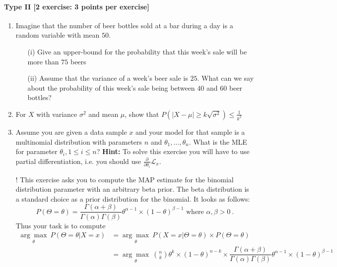\documentclass{article}
\begin{document}
\paragraph{Type II [2 exercise: 3 points per exercise]}
\begin{enumerate}
	\item Imagine that the number of beer bottles sold at a bar during a day is a random variable with mean $50$.
		\begin{itemize}
			\item[(i)] Give an upper-bound for the probability that this week's sale will be more than $75$ beers
			\item[(ii)] Assume that the variance of a week's beer sale is $25$. What can we say about the probability of this week's sale being between $40$ and $60$ beer bottles?
		\end{itemize}
	
	\item For $X$ with variance $\sigma^2$ and mean $\mu$, show that $P(|X-\mu| \geq k\sqrt{\sigma^2}) \leq \frac{1}{k^2}$
	
	\item Assume you are given a data sample $ x $ and your model for that sample is a multinomial distribution with parameters $ n $ and 
	$ \theta_{1}, \ldots, \theta_{n} $. What is the MLE for parameter $ \theta_{i}, 1 \leq i \leq n $? \textbf{Hint:} To solve this exercise you will
	have to use partial differentiation, i.e. you should use $ \frac{\partial}{\partial\theta_{i}}\mathcal{L}_{x} $.
	\item[\arabic{enumi}!] This exercise asks you to compute the MAP estimate for the binomial distribution parameter with an arbitrary beta prior. The beta distribution
	is a standard choice as a prior distribution for the binomial. It looks as follows:
	\begin{equation*}
	P(\Theta=\theta) = \dfrac{\Gamma(\alpha + \beta)}{\Gamma(\alpha)\Gamma(\beta)}\theta^{\alpha-1} \times (1-\theta)^{\beta-1} \mbox{ where } \alpha, \beta > 0 \ .
	\end{equation*}
	Thus your task is to compute
	\begin{align*}
	\underset{\theta}{\arg\max}~P(\Theta=\theta|X=x) &= \underset{\theta}{\arg\max}~P(X =x |\Theta = \theta) \times P(\Theta = \theta) \\
	&= \underset{\theta}{\arg\max}~\binom{n}{k}\theta^{k}\times (1-\theta)^{n-k} \times \dfrac{\Gamma(\alpha + \beta)}{\Gamma(\alpha)\Gamma(\beta)}\theta^{\alpha-1} \times (1-\theta)^{\beta-1}
	\end{align*}
\end{enumerate}
\end{document}
